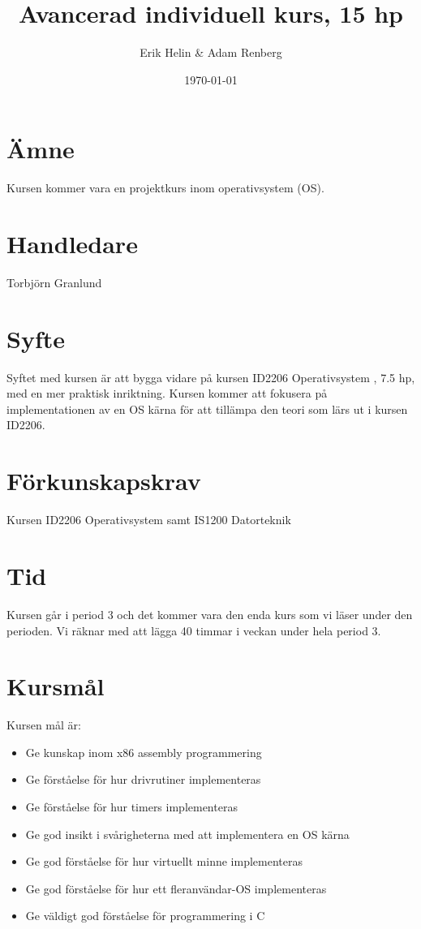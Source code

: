 \documentclass[11pt,oneside,a4paper]{article}
\begin{document}
\title{Avancerad individuell kurs, 15 hp}
\author{Erik Helin \& Adam Renberg}
\date{\today}
\maketitle

\section{Ämne}
Kursen kommer vara en projektkurs inom operativsystem (OS).

\section{Handledare}
Torbjörn Granlund

\section{Syfte}
Syftet med kursen är att bygga vidare på kursen ID2206 Operativsystem
, 7.5 hp, med en mer praktisk inriktning. Kursen kommer att fokusera 
på implementationen av en OS kärna för att tillämpa den teori som lärs 
ut i kursen ID2206.

\section{Förkunskapskrav}
Kursen ID2206 Operativsystem samt IS1200 Datorteknik

\section{Tid}
Kursen går i period 3 och det kommer vara den enda kurs som vi läser under
den perioden. Vi räknar med att lägga 40 timmar i veckan under hela period 3.

\section{Kursmål}
Kursen mål är:
\begin{itemize}
    \item Ge kunskap inom x86 assembly programmering
    \item Ge förståelse för hur drivrutiner implementeras
    \item Ge förståelse för hur timers implementeras
    \item Ge god insikt i svårigheterna med att implementera en OS kärna
    \item Ge god förståelse för hur virtuellt minne implementeras
    \item Ge god förståelse för hur ett fleranvändar-OS implementeras
    \item Ge väldigt god förståelse för programmering i C
\end{itemize}
\end{document}
